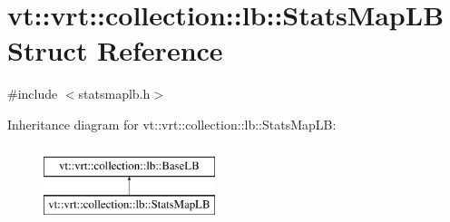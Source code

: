 \hypertarget{structvt_1_1vrt_1_1collection_1_1lb_1_1_stats_map_l_b}{}\section{vt\+:\+:vrt\+:\+:collection\+:\+:lb\+:\+:Stats\+Map\+LB Struct Reference}
\label{structvt_1_1vrt_1_1collection_1_1lb_1_1_stats_map_l_b}


{\ttfamily \#include $<$statsmaplb.\+h$>$}

Inheritance diagram for vt\+:\+:vrt\+:\+:collection\+:\+:lb\+:\+:Stats\+Map\+LB\+:\begin{figure}[H]
\begin{center}
\leavevmode
\includegraphics[height=2.000000cm]{structvt_1_1vrt_1_1collection_1_1lb_1_1_stats_map_l_b}
\end{center}
\end{figure}
